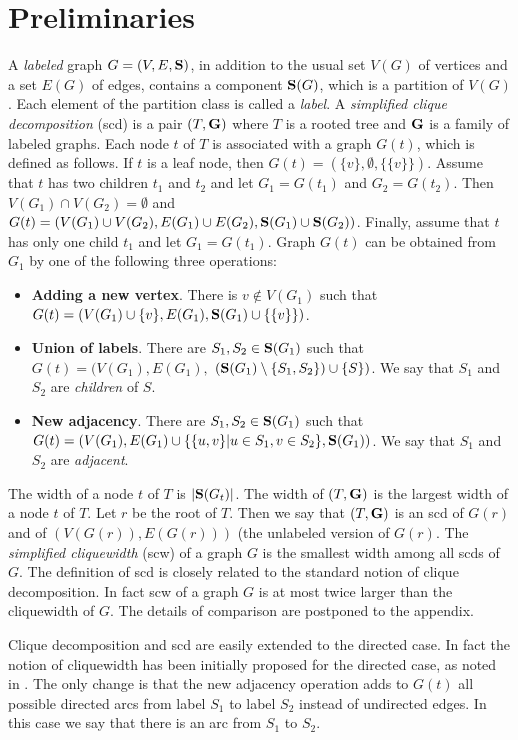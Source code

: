 \documentclass{llncs}
\begin{document}
\section{Preliminaries}
A \emph{labeled} graph $G=(V,E,{\bf S})$, in addition to the usual set $V(G)$ of vertices and a set $E(G)$ of edges, contains
a component ${\bf S}(G)$, which is a partition of $V(G)$. Each element of the partition class is called a \emph{label}.
A \emph{simplified clique decomposition} ({\sc scd}) is a pair $(T,{\bf G})$ where $T$ is a rooted tree and ${\bf G}$ is a family of labeled graphs.
Each node $t$ of $T$ is associated with a graph $G(t)$, which is defined as follows.
If $t$ is a leaf node, then $G(t)=(\{v\},\emptyset,\{\{v\}\})$. Assume that $t$ has two children $t_1$ and $t_2$ and let $G_1=G(t_1)$
and $G_2=G(t_2)$.
Then $V(G_1) \cap V(G_2)=\emptyset$ and $G(t)=(V(G_1) \cup V(G_2), E(G_1) \cup E(G_2), {\bf S}(G_1) \cup {\bf S}(G_2))$.
Finally, assume that $t$ has only one child $t_1$ and let $G_1=G(t_1)$. Graph $G(t)$ can be obtained from $G_1$ by one
of the following three operations:
\begin{itemize}
\item {\bf Adding a new vertex}. There is $v \notin V(G_1)$ such that $G(t)=(V(G_1) \cup \{v\},E(G_1),{\bf S}(G_1) \cup \{\{v\}\})$.
\item {\bf Union of labels}. There are $S_1,S_2 \in {\bf S}(G_1)$ such that $G(t)=(V(G_1),E(G_1),$ $({\bf S}(G_1) \setminus \{S_1,S_2\}) \cup \{S\})$.
We say that $S_1$ and $S_2$ are \emph{children} of $S$.
\item {\bf New adjacency}. There are $S_1,S_2 \in {\bf S}(G_1)$ such that $G(t)=(V(G_1),E(G_1) \cup \{\{u,v\}|u \in S_1,v \in S_2\},{\bf S}(G_1))$.
We say that $S_1$ and $S_2$ are \emph{adjacent}. 
\end{itemize}

The width of a node $t$ of $T$ is $|{\bf S}(G_t)|$. The width of $(T,{\bf G})$ is the largest width of a node $t$ of $T$.
Let $r$ be the root of $T$. Then we say that $(T,{\bf G})$ is an {\sc scd} of $G(r)$ and of $(V(G(r)),E(G(r)))$
(the unlabeled version of $G(r)$. The \emph{simplified cliquewidth} ({\sc scw}) of a graph $G$ is the smallest width among all 
{\sc scd}s of $G$. The definition of {\sc scd} is closely related to the standard notion of clique decomposition. 
In fact {\sc scw} of a graph $G$ is at most twice larger than the cliquewidth of $G$. The details of comparison are postponed
to the appendix.

Clique decomposition and {\sc scd} are easily extended to the directed case.
In fact the notion of cliquewidth has been initially proposed for the directed case, as noted in  \cite{COMMA2010}. 
The only change is that the new adjacency operation adds to $G(t)$ all possible directed arcs from label $S_1$ to
label $S_2$ instead of undirected edges. In this case we say that there is an arc from $S_1$ to $S_2$.
\end{document}
